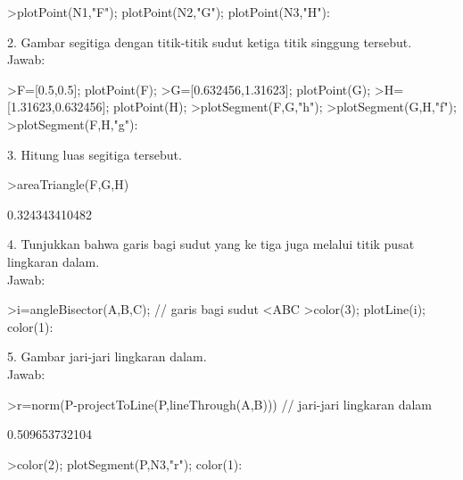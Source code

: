 \documentclass{article}
\begin{document}
\begin{eulernotebook}
\begin{eulerprompt}
>plotPoint(N1,"F"); plotPoint(N2,"G"); plotPoint(N3,"H"):
\end{eulerprompt}
\begin{eulercomment}
2. Gambar segitiga dengan titik-titik sudut ketiga titik singgung
tersebut.\\
Jawab:
\end{eulercomment}
\begin{eulerprompt}
>F=[0.5,0.5]; plotPoint(F);
>G=[0.632456,1.31623]; plotPoint(G);
>H=[1.31623,0.632456]; plotPoint(H);
>plotSegment(F,G,"h");
>plotSegment(G,H,"f");
>plotSegment(F,H,"g"):
\end{eulerprompt}
\begin{eulercomment}
3. Hitung luas segitiga tersebut.
\end{eulercomment}
\begin{eulerprompt}
>areaTriangle(F,G,H)
\end{eulerprompt}
\begin{euleroutput}
  0.324343410482
\end{euleroutput}
\begin{eulercomment}
4. Tunjukkan bahwa garis bagi sudut yang ke tiga juga melalui titik
pusat lingkaran dalam.\\
Jawab:
\end{eulercomment}
\begin{eulerprompt}
>i=angleBisector(A,B,C); // garis bagi sudut <ABC
>color(3); plotLine(i); color(1):
\end{eulerprompt}
\begin{eulercomment}
5. Gambar jari-jari lingkaran dalam.\\
Jawab:
\end{eulercomment}
\begin{eulerprompt}
>r=norm(P-projectToLine(P,lineThrough(A,B))) // jari-jari lingkaran dalam
\end{eulerprompt}
\begin{euleroutput}
  0.509653732104
\end{euleroutput}
\begin{eulerprompt}
>color(2); plotSegment(P,N3,"r"); color(1):
\end{eulerprompt}

\end{eulernotebook}
\end{document}

